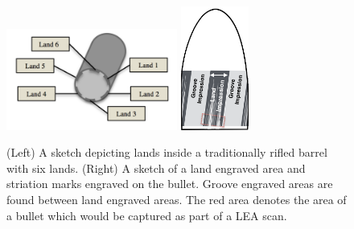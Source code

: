 \documentclass[12pt]{article}
\begin{document}
\begin{figure}

\includegraphics[width=0.5\textwidth]{../images/scanning-stage0}
\hspace{3cm}
\includegraphics[width=0.2\textwidth]{../images/bullet-sketch}
\caption{(Left) A sketch depicting lands inside a traditionally rifled barrel with six lands. (Right) A sketch of a land engraved area and striation marks engraved on the bullet. Groove engraved areas are found between land engraved areas. The red area denotes the area of a bullet which would be captured as part of a LEA scan.}
\label{barrel-bullet}
\end{figure}
\end{document}
